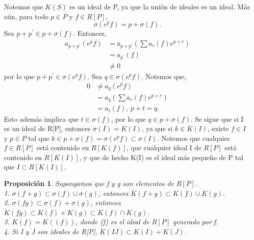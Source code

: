 \documentclass[12pt,spanish]{amsart}
\newtheorem{prop}[Theorem]{Proposición}
\theoremstyle{definition}
\theoremstyle{remark}
\begin{document}
Notemos que $K(S)$ es un ideal de P, ya que la unión de ideales es un ideal. Más aún, para todo $p\in P$ y $f\in R[P]$,
$$\sigma(e^{p}f)=p+\sigma(f).$$
Sea $p+p^{\prime}\in p+\sigma(f)$. Entonces,
\begin{equation*}
\begin{split}
a_{p+p^{\prime}}(e^{p}f) &= a_{p+p^{\prime}}(\sum a_{r}(f)e^{p+r}) \\ &= a_{p^{\prime}}(f) \\
&\neq 0
\end{split}
\end{equation*}
por lo que $p+p^{\prime}\in \sigma(e^{p}f)$. Sea $q\in \sigma(e^{p}f)$. Notemos que,
\begin{equation*}
\begin{split}
0 &\neq a_{q}(e^{p}f) \\
&= a_{q}(\sum a_{r}(f)e^{p+r}) \\
&= a_{t}(f),~p+t=q.
\end{split}
\end{equation*}
Esto además implica que $t\in \sigma(f)$, por lo que $q\in p+\sigma(f)$. Se sigue que si I es un ideal de R[P], entonces $\sigma(I)=K(I)$, ya que si $k\in K(I)$, existe $f\in I$ y $p\in P$ tal que $k\in p+ \sigma(f)=\sigma(e^{p}f)\subset \sigma(I)$. Notemos que cualquier $f\in R[P]$ está contenido en $R[K(f)]$, que cualquier ideal I de $R[P]$ está contenido en $R[K(I)]$, y que de hecho K(I) es el ideal más pequeño de P tal que $I\subset R[K(I)]$. 


\begin{prop}
Supongamos que f y g son elementos de $R[P]$. \\
1. $\sigma(f+g) \subset \sigma(f) \cup \sigma(g)$, entonces $K(f+g)\subset K(f) \cup K(g)$. \\
2. $\sigma(fg)\subset \sigma(f)+\sigma(g)$, entonces $K(fg) \subset K(f)+K(g) \subset K(f) \cap K(g)$. \\
3. $K(f)=K((f))$, donde (f) es el ideal de $R[P]$ generado por f. \\
4. Si I y J son ideales de R[P], $K(IJ)\subset K(I)+K(J)$. 
\end{prop}
 
\end{document}

